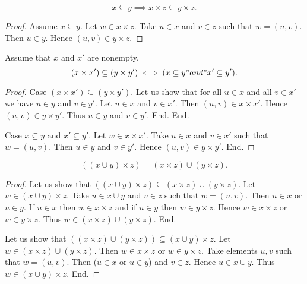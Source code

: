 \documentclass[../../sets-and-functions.ftl.tex]{subfiles}
\begin{document}
  \begin{forthel}
    \begin{proposition}[SF 01 05 197314]
      $$x \subseteq y \implies x \times z \subseteq y \times z.$$
    \end{proposition}
    \begin{proof}
      Assume $x \subseteq y$.
      Let $w \in x \times z$.
      Take $u \in x$ and $v \in z$ such that $w = (u,v)$.
      Then $u \in y$.
      Hence $(u,v) \in y \times z$.
    \end{proof}

    \begin{proposition}[SF 01 05 238807]
      Assume that $x$ and $x'$ are nonempty.
      $$(x \times x') \subseteq (y \times y') \iff (x \subseteq y "and" x' \subseteq y').$$
    \end{proposition}
    \begin{proof}
      Case $(x \times x') \subseteq (y \times y')$.
        Let us show that for all $u \in x$ and all $v \in x'$ we have $u \in y$ and $v \in y'$.
          Let $u \in x$ and $v \in x'$.
          Then $(u,v) \in x \times x'$.
          Hence $(u,v) \in y \times y'$.
          Thus $u \in y$ and $v \in y'$.
        End.
      End.

      Case $x \subseteq y$ and $x' \subseteq y'$.
        Let $w \in x \times x'$.
        Take $u \in x$ and $v \in x'$ such that $w = (u,v)$.
        Then $u \in y$ and $v \in y'$.
        Hence $(u,v) \in y \times y'$.
      End.
    \end{proof}

    \begin{proposition}[SF 01 05 138531]
      $$((x \cup y) \times z) = (x \times z) \cup (y \times z).$$
    \end{proposition}
    \begin{proof}
      Let us show that $((x \cup y) \times z) \subseteq (x \times z) \cup (y \times z).$
        Let $w \in (x \cup y) \times z$.
        Take $u \in x \cup y$ and $v \in z$ such that $w = (u,v)$.
        Then $u \in x$ or $u \in y$.
        If $u \in x$ then $w \in x \times z$ and if $u \in y$ then $w \in y \times z$.
        Hence $w \in x \times z$ or $w \in y \times z$.
        Thus $w \in (x \times z) \cup (y \times z)$.
      End.

      Let us show that $((x \times z) \cup (y \times z)) \subseteq (x \cup y) \times z$.
        Let $w \in (x \times z) \cup (y \times z)$.
        Then $w \in x \times z$ or $w \in y \times z$.
        Take elements $u,v$ such that $w = (u,v)$.
        Then ($u \in x$ or $u \in y$) and $v \in z$.
        Hence $u \in x \cup y$.
        Thus $w \in (x \cup y) \times z$.
      End.
    \end{proof}


\end{forthel}
\end{document}
